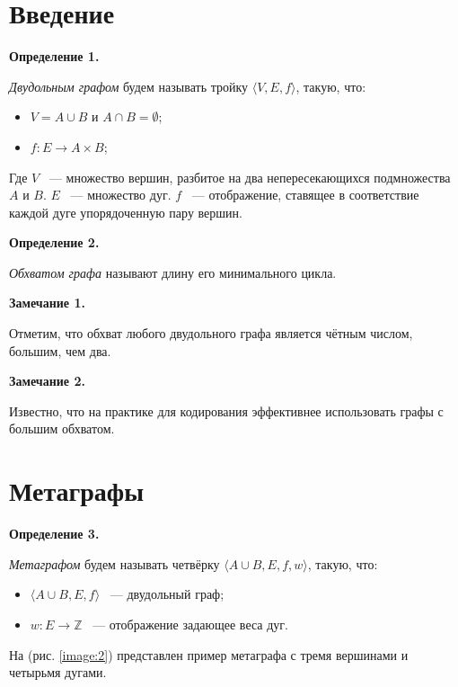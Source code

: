 \documentclass[14pt]{mmcs-article}
\begin{document}
\section*{Введение}

\textbf{Определение 1.}

\textsl{Двудольным графом} будем называть тройку $\langle V,E,f \rangle$, такую, что:

\begin{itemize}
    \item $V = A \cup B$ и $A \cap B = \emptyset$;
    \item $f: E \rightarrow A \times B$;
\end{itemize}

Где $V$ ~--- множество вершин, разбитое на два непересекающихся подмножества $A$ и $B$.
$E$ ~--- множество дуг.
$f$ ~--- отображение, ставящее в соответствие каждой дуге упорядоченную пару вершин.

\textbf{Определение 2.}

\textsl{Обхватом графа} называют длину его минимального цикла.

\textbf{Замечание 1.}

Отметим, что обхват любого двудольного графа является чётным числом, большим, чем два.

\textbf{Замечание 2.}

Известно, что на практике для кодирования эффективнее использовать графы с большим обхватом.

\pagebreak
\section*{Метаграфы}

\textbf{Определение 3.}

\textsl{Метаграфом} будем называть четвёрку $\langle A \cup B,E,f,w \rangle$, такую, что:

\begin{itemize}
    \item $\langle A \cup B,E,f \rangle$ ~--- двудольный граф;
    \item $w: E \rightarrow \mathbb{Z}$ ~--- отображение задающее веса дуг.
\end{itemize}

На (рис. \ref{image:2}) представлен пример метаграфа с тремя вершинами и четырьмя дугами.
\end{document}
